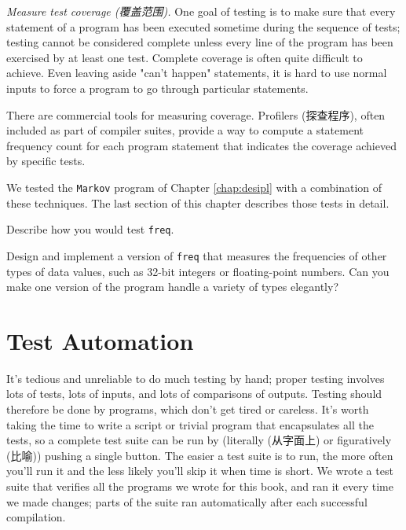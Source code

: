 \emph{Measure test coverage (覆盖范围).} One goal of testing is to make
sure that every statement of a program has been executed sometime during
the sequence of tests; testing cannot be considered complete unless every
line of the program has been exercised by at least one test. Complete
coverage is often quite difficult to achieve. Even leaving aside "can't
happen" statements, it is hard to use normal inputs to force a program to
go through particular statements.

There are commercial tools for measuring coverage. Profilers (探查程序),
often included as part of compiler suites, provide a way to compute a
statement frequency count for each program statement that indicates the
coverage achieved by specific tests.

We tested the \texttt{Markov} program of Chapter \ref{chap:desipl} with a
combination of these techniques. The last section of this chapter describes
those tests in detail.

\begin{exercise}
    Describe how you would test \texttt{freq}.
\end{exercise}

\begin{exercise}
    Design and implement a version of \texttt{freq} that measures the
    frequencies of other types of data values, such as 32-bit integers or
    floating-point numbers. Can you make one version of the program handle
    a variety of types elegantly?
\end{exercise}

\section{Test Automation}
\label{sec:test_automation}

It's tedious and unreliable to do much testing by hand; proper testing
involves lots of tests, lots of inputs, and lots of comparisons of outputs.
Testing should therefore be done by programs, which don't get tired or
careless. It's worth taking the time to write a script or trivial program
that encapsulates all the tests, so a complete test suite can be run by
(literally (从字面上) or figuratively (比喻)) pushing a single button. The
easier a test suite is to run, the more often you'll run it and the less
likely you'll skip it when time is short. We wrote a test suite that
verifies all the programs we wrote for this book, and ran it every time we
made changes; parts of the suite ran automatically after each successful
compilation.

